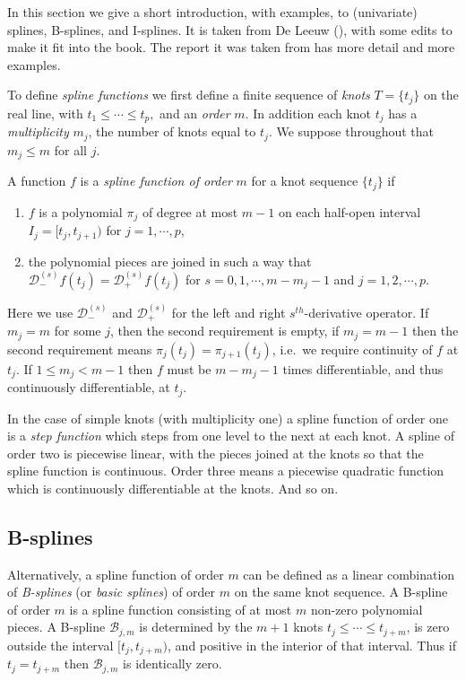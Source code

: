 \documentclass[
  12pt,
  letterpaper,
  DIV=11,
  numbers=noendperiod]{scrreprt}
\providecommand{\tightlist}{%
  \setlength{\itemsep}{0pt}\setlength{\parskip}{0pt}}\usepackage{longtable,booktabs,array}
\theoremstyle{remark}
\begin{document}
In this section we give a short introduction, with examples, to
(univariate) splines, B-splines, and I-splines. It is taken from De
Leeuw (), with some edits to make it
fit into the book. The report it was taken from has more detail and more
examples.

To define \emph{spline functions} we first define a finite sequence of
\emph{knots} \(T=\{t_j\}\) on the real line, with
\(t_1\leq\cdots\leq t_p,\) and an \emph{order} \(m\). In addition each
knot \(t_j\) has a \emph{multiplicity} \(m_j\), the number of knots
equal to \(t_j\). We suppose throughout that \(m_j\leq m\) for all
\(j\).

A function \(f\) is a \emph{spline function of order} \(m\) for a knot
sequence \(\{t_j\}\) if

\begin{enumerate}
\def\labelenumi{\arabic{enumi}.}
\tightlist
\item
  \(f\) is a polynomial \(\pi_j\) of degree at most \(m-1\) on each
  half-open interval \(I_j=[t_j,t_{j+1})\) for \(j=1,\cdots,p\),
\item
  the polynomial pieces are joined in such a way that
  \(\mathcal{D}^{(s)}_-f(t_j)=\mathcal{D}^{(s)}_+f(t_j)\) for
  \(s=0,1,\cdots,m-m_j-1\) and \(j=1,2,\cdots,p\).
\end{enumerate}

Here we use \(\mathcal{D}^{(s)}_-\) and \(\mathcal{D}^{(s)}_+\) for the
left and right \(s^{th}\)-derivative operator. If \(m_j=m\) for some
\(j\), then the second requirement is empty, if \(m_j=m-1\) then the
second requirement means \(\pi_j(t_j)=\pi_{j+1}(t_j)\), i.e.~we require
continuity of \(f\) at \(t_j\). If \(1\leq m_j<m-1\) then \(f\) must be
\(m-m_j-1\) times differentiable, and thus continuously differentiable,
at \(t_j\).

In the case of simple knots (with multiplicity one) a spline function of
order one is a \emph{step function} which steps from one level to the
next at each knot. A spline of order two is piecewise linear, with the
pieces joined at the knots so that the spline function is continuous.
Order three means a piecewise quadratic function which is continuously
differentiable at the knots. And so on.

\subsection{B-splines}\label{mathbsplines}

Alternatively, a spline function of order \(m\) can be defined as a
linear combination of \emph{B-splines} (or \emph{basic splines}) of
order \(m\) on the same knot sequence. A B-spline of order \(m\) is a
spline function consisting of at most \(m\) non-zero polynomial pieces.
A B-spline \(\mathcal{B}_{j,m}\) is determined by the \(m+1\) knots
\(t_j\leq\cdots\leq t_{j+m}\), is zero outside the interval
\([t_j,t_{j+m})\), and positive in the interior of that interval. Thus
if \(t_j=t_{j+m}\) then \(\mathcal{B}_{j,m}\) is identically zero.
\end{document}
